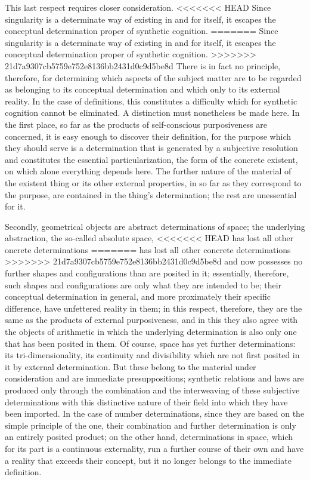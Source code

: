 This last respect requires closer consideration.
<<<<<<< HEAD
Since singularity is a determinate way of existing in and for itself,
it escapes the conceptual determination proper of synthetic cognition.
=======
Since singularity is a determinate
way of existing in and for itself,
it escapes the conceptual determination
proper of synthetic cognition.
>>>>>>> 21d7a9307cb5759e752e8136bb2431d0c9d5be8d
There is in fact no principle, therefore,
for determining which aspects of the subject matter are
to be regarded as belonging to its conceptual determination
and which only to its external reality.
In the case of definitions, this constitutes a difficulty
which for synthetic cognition cannot be eliminated.
A distinction must nonetheless be made here.
In the first place, so far as the products of
self-conscious purposiveness are concerned,
it is easy enough to discover their definition,
for the purpose which they should serve is
a determination that is generated by a subjective resolution
and constitutes the essential particularization,
the form of the concrete existent,
on which alone everything depends here.
The further nature of the material of
the existent thing or its other external properties,
in so far as they correspond to the purpose,
are contained in the thing's determination;
the rest are unessential for it.

Secondly, geometrical objects are abstract determinations of space;
the underlying abstraction, the so-called absolute space,
<<<<<<< HEAD
has lost all other oncrete determinations
=======
has lost all other concrete determinations
>>>>>>> 21d7a9307cb5759e752e8136bb2431d0c9d5be8d
and now possesses no further shapes and configurations
than are posited in it;
essentially, therefore, such shapes and configurations are
only what they are intended to be;
their conceptual determination in general,
and more proximately their specific difference,
have unfettered reality in them;
in this respect, therefore, they are the same as
the products of external purposiveness,
and in this they also agree with
the objects of arithmetic in which
the underlying determination is also
only one that has been posited in them.
Of course, space has yet further determinations:
its tri-dimensionality, its continuity and divisibility which
are not first posited in it by external determination.
But these belong to the material under consideration
and are immediate presuppositions;
synthetic relations and laws are produced only
through the combination and the interweaving of
these subjective determinations with
this distinctive nature of their field
into which they have been imported.
In the case of number determinations,
since they are based on the simple principle of the one,
their combination and further determination is
only an entirely posited product;
on the other hand, determinations in space,
which for its part is a continuous externality,
run a further course of their own
and have a reality that exceeds their concept,
but it no longer belongs to the immediate definition.

